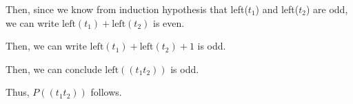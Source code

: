 \documentclass[12pt]{article}
\begin{document}
\begin{mdframed}
\begin{enumerate}
\begin{mdframed}
        \bigskip

        Then, since we know from induction hypothesis that left($t_1$) and left($t_2$)
        are odd, we can write $\text{left}(t_1) + \text{left}(t_2)$ is even.

        \bigskip

        Then, we can write $\text{left}(t_1) + \text{left}(t_2) + 1$ is odd.

        \bigskip

        Then, we can conclude $\text{left}((t_1t_2))$ is odd.

        \bigskip

        Thus, $P((t_1t_2))$ follows.

        \end{mdframed}
    \end{enumerate}
\end{mdframed}
\end{document}
